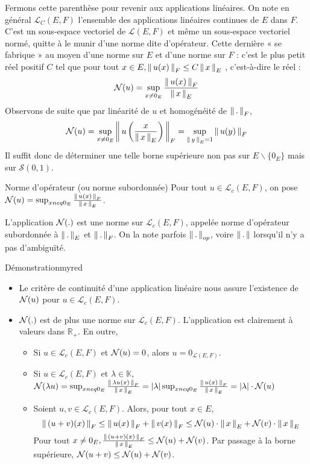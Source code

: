     Fermons cette parenthèse pour revenir aux applications linéaires. On note en général $\mathcal{L}_C(E,F)$ l’ensemble des applications linéaires continues de $E$ dans $F$. C’est un sous-espace vectoriel de $\mathcal{L}(E,F)$ et même un sous-espace vectoriel normé, quitte à le munir d’une norme dite d’opérateur. Cette dernière « se fabrique » au moyen d’une norme sur $E$ et d’une norme sur $F$ : c’est le plus petit réel positif $C$ tel que pour tout $x \in E, \left\lVert\,u(x)\,\right\rVert_F \leq C \left\lVert\,x\,\right\rVert_E$ , c’est-à-dire le réel :
    \[ \mathcal{N}(u) = \sup_{x \neq 0_E} \frac{\left\lVert\,u(x)\,\right\rVert_F}{\left\lVert\,x\,\right\rVert_E} \]
    Observons de suite que par linéarité de $u$ et homogénéité de $\left\lVert\,.\,\right\rVert_F$, 
    \[ \mathcal{N}(u) = \sup_{x \neq 0_E} \left\lVert\,u\left(\frac{x}{\left\lVert\,x\,\right\rVert_E}\right)\,\right\rVert_F = \sup_{\left\lVert\,y\,\right\rVert_E = 1} \left\lVert\,u(y)\,\right\rVert_F \] 
    Il suffit donc de déterminer une telle borne supérieure non pas sur $E \backslash \{ 0_E \}$ mais sur $\mathcal{S}(0,1)$.

    \begin{theo}{Norme d’opérateur (ou norme subordonnée)}
        Pour tout $u \in \mathcal{L}_c(E,F)$, on pose $\mathcal{N}(u) = \sup_{x neq 0_E} \frac{\left\lVert\,u(x)\,\right\rVert_F}{\left\lVert\,x\,\right\rVert_E}$. 

        L’application $\mathcal{N}(.)$ est une norme sur $\mathcal{L}_c(E,F)$, appelée norme d’opérateur subordonnée à $\left\lVert\,.\,\right\rVert_E$ et $\left\lVert\,.\,\right\rVert_F$. On la note parfois $\left\lVert\,.\,\right\rVert_{op}$, voire $\left\lVert\,.\,\right\rVert$ lorsqu’il n’y a pas d’ambiguïté.
    \end{theo}

    \begin{demo}{Démonstration}{myred}
        \begin{itemize}
            \item Le critère de continuité d’une application linéaire nous assure l’existence de $\mathcal{N}(u)$ pour $u \in \mathcal{L}_c(E,F)$.
            \item $\mathcal{N}(.)$ est de plus une norme sur $\mathcal{L}_c(E,F)$. L’application est clairement à valeurs dans $\mathbb{R}_+$. En outre, 
            \begin{itemize}
                \item Si $u \in \mathcal{L}_c(E,F)$ et $\mathcal{N}(u) = 0$, alors $u = 0_{\mathcal{L}(E,F)}$.
                \item Si $u \in \mathcal{L}_c(E,F)$ et $\lambda \in \mathbb{K}$, $\mathcal{N}(\lambda u) = \sup_{x neq 0_E} \frac{\left\lVert\,\lambda u(x)\,\right\rVert_F}{\left\lVert\,x\,\right\rVert_E} = \left\lvert \lambda\right\rvert \sup_{x neq 0_E} \frac{\left\lVert\,u(x)\,\right\rVert_F}{\left\lVert\,x\,\right\rVert_E} = \left\lvert \lambda\right\rvert \cdot \mathcal{N}(u)$
                \item Soient $u,v \in \mathcal{L}_c(E,F)$. Alors, pour tout $x \in E$, 
                \[ \left\lVert\,(u+v)(x)\,\right\rVert_F \leq \left\lVert\,u(x)\,\right\rVert_F + \left\lVert\,v(x)\,\right\rVert_F \leq \mathcal{N}(u) \cdot \left\lVert\,x\,\right\rVert_E + \mathcal{N}(v) \cdot \left\lVert\,x\,\right\rVert_E \] 
                Pour tout $x \neq 0_E, \frac{\left\lVert\,(u+v)(x)\,\right\rVert_F}{\left\lVert\,x\,\right\rVert_E} \leq \mathcal{N}(u) + \mathcal{N}(v)$. Par passage à la borne supérieure, $\mathcal{N}(u+v) \leq \mathcal{N}(u) + \mathcal{N}(v)$.
            \end{itemize}
        \end{itemize}
    \end{demo}

